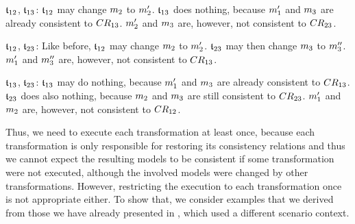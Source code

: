 \begin{properdescription}
    \item[$\mathfrak{t}_{12}$, $\mathfrak{t}_{13}$:] 
    $\mathfrak{t}_{12}$ may change $m_{2}$ to $m_{2}'$. $\mathfrak{t}_{13}$ does nothing, because $m_{1}'$ and $m_{3}$ are already consistent to $CR_{13}$.
    $m_{2}'$ and $m_{3}$ are, however, not consistent to $CR_{23}$.
    \item[$\mathfrak{t}_{12}$, $\mathfrak{t}_{23}$:] 
    Like before, $\mathfrak{t}_{12}$ may change $m_{2}$ to $m_{2}'$. 
    $\mathfrak{t}_{23}$ may then change $m_{3}$ to $m_{3}''$. 
    $m_{1}'$ and $m_{3}''$ are, however, not consistent to $CR_{13}$.
    \item[$\mathfrak{t}_{13}$, $\mathfrak{t}_{23}$:]
    $\mathfrak{t}_{13}$ may do nothing, because $m_{1}'$ and $m_{3}$ are already consistent to $CR_{13}$.
    $\mathfrak{t}_{23}$ does also nothing, because $m_{2}$ and $m_{3}$ are still consistent to $CR_{23}$.
    $m_{1}'$ and $m_{2}$ are, however, not consistent to $CR_{12}$.
\end{properdescription}

Thus, we need to execute each transformation at least once, because each transformation is only responsible for restoring its consistency relations and thus we cannot expect the resulting models to be consistent if some transformation were not executed, although the involved models were changed by other transformations.
However, restricting the execution to each transformation once is not appropriate either.
To show that, we consider examples that we derived from those we have already presented in , which used a different scenario context.

